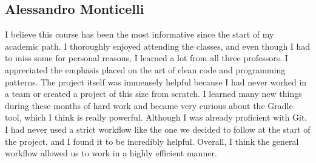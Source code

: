 \subsection{Alessandro Monticelli}
I believe this course has been the most informative since the start of my academic path. \newline
I thoroughly enjoyed attending the classes, and even though I had to miss some for personal reasons, I learned a lot from all three professors.\newline
I appreciated the emphasis placed on the art of clean code and programming patterns. \newline
The project itself was immensely helpful because I had never worked in a team or created a project of this size from scratch. \newline
I learned many new things during these months of hard work and became very curious about the Gradle tool, which I think is really powerful. 
Although I was already proficient with Git, I had never used a strict workflow like the one we decided to follow at the start of the project, 
and I found it to be incredibly helpful. Overall, I think the general workflow allowed us to work in a highly efficient manner.